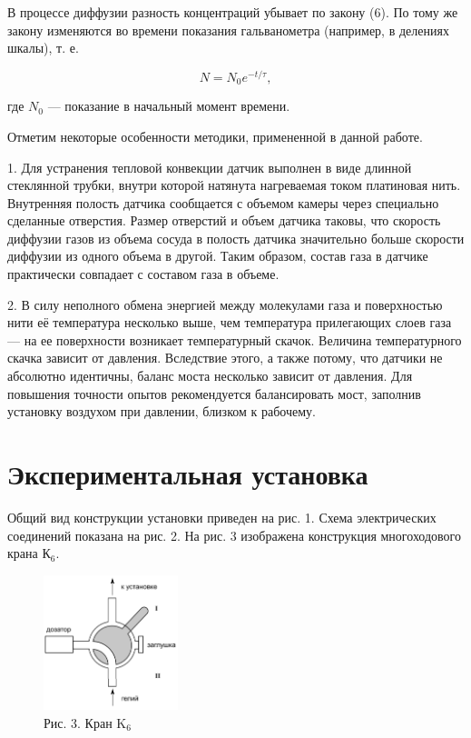 \documentclass[a4paper,12pt]{article} %
\begin{document}
В процессе диффузии разность концентраций убывает по закону (6). По тому же закону изменяются во времени показания гальванометра (например, в делениях шкалы), т. е.



\begin{equation}
	N = N_{0}e^{-t/\tau},
\end{equation}


\noindent где $N_{0}$ — показание в начальный момент времени.


\vspace{5mm}
Отметим некоторые особенности методики, примененной в данной работе.


1. Для устранения тепловой конвекции датчик выполнен в виде длинной стеклянной трубки, внутри которой натянута нагреваемая током платиновая нить. Внутренняя полость датчика сообщается с объемом камеры через специально сделанные отверстия. Размер отверстий и объем датчика таковы, что скорость диффузии газов из объема сосуда в полость датчика значительно больше скорости диффузии из одного объема в другой. Таким образом, состав газа в датчике практически совпадает с составом газа в объеме.


2. В силу неполного обмена энергией между молекулами газа и поверхностью нити её температура несколько выше, чем температура прилегающих слоев газа — на ее поверхности возникает температурный скачок. Величина температурного скачка зависит от давления. Вследствие этого, а также потому, что датчики не абсолютно идентичны, баланс моста несколько зависит от давления. Для повышения точности опытов рекомендуется балансировать мост, заполнив установку воздухом при давлении, близком к рабочему.

\newpage
\section*{Экспериментальная установка}
Общий вид конструкции установки приведен на рис. 1. Схема электрических соединений показана на рис. 2. На рис. 3 изображена конструкция многоходового крана К$_{6}$.


\begin{figure}
	\includegraphics[width=0.35\textwidth]{Рис3.png}
	\caption*{\footnotesize{Рис. 3. Кран K$_{6}$}}
\end{figure}
\end{document}
